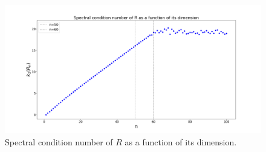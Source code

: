 \documentclass[a4paper,11pt]{article}
\begin{document}
\begin{figure}[H]
	\centering
	\includegraphics[scale=0.25]{Plot/Spectral_cond_num_R}
	\caption{Spectral condition number of $R$ as a function of its dimension.}
	\label{fig:Spectral_cond_num_R}
\end{figure}

	
	
\end{document}
